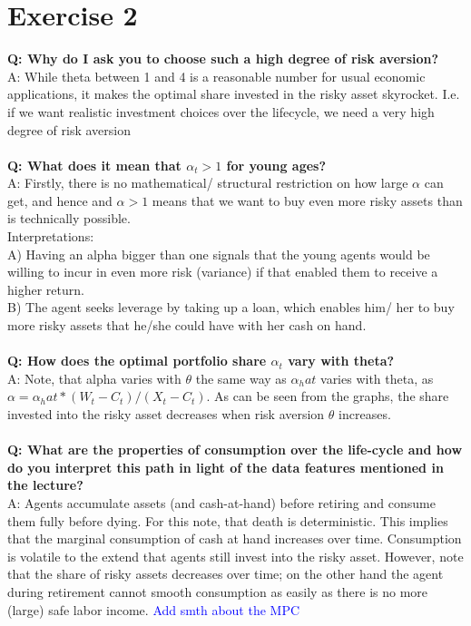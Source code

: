 \documentclass[12pt,a4paper]{article}
\begin{document}
\section*{Exercise 2}

\textbf{Q: Why do I ask you to choose such a high degree of risk aversion?}\\
A: While theta between 1 and 4 is a reasonable number for usual economic applications, it makes the optimal share invested in the risky asset skyrocket. I.e. if we want realistic investment choices over the lifecycle, we need a very high degree of risk aversion \\ \\

\textbf{Q: What does it mean that $\alpha_t > 1$ for young ages? }\\
A: Firstly, there is no mathematical/ structural restriction on how large $\alpha$ can get, and hence and $\alpha >1$ means that we want to buy even more risky assets than is technically possible. \\

Interpretations:\\
A) Having an alpha bigger than one signals that the young agents would be willing to incur in even more risk (variance) if that enabled them to receive a higher return. \\
B) The agent seeks leverage by taking up a loan, which enables him/ her to buy more risky assets that he/she could have with her cash on hand. 
\\ \\

\textbf{Q: How does the optimal portfolio share $\alpha_t$ vary with theta? }\\
A: Note, that alpha varies with $\theta$ the same way as $\alpha_hat$ varies with theta, as $\alpha = \alpha_hat * (W_t - C_t)/ (X_t - C_t)$. As can be seen from the graphs, the share invested into the risky asset decreases when risk aversion $\theta$ increases. \\ \\

\textbf{Q: What are the properties of consumption over the life-cycle and how do you interpret this path in light of the data features mentioned in the lecture?}\\
A: Agents accumulate assets (and cash-at-hand) before retiring and consume them fully before dying. For this note, that death is deterministic. This implies that the marginal consumption of cash at hand increases over time. Consumption is volatile to the extend that agents still invest into the risky asset. However, note that the share of risky assets decreases over time; on the other hand the agent during retirement cannot smooth consumption as easily as there is no more (large) safe labor income. 
\textcolor{blue}{Add smth about the MPC}\\ \\
\end{document}
